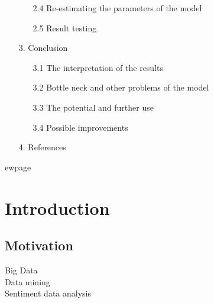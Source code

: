 \documentclass {article}
\begin{document}
\begin{enumerate}
\begin{enumerate}
			\item[2.4] Re-estimating the parameters of the model 
			\item[2.5] Result testing
		\end{enumerate}
	\item[3.] Conclusion
		\begin{enumerate}
			\item[3.1] The interpretation of the results
			\item[3.2] Bottle neck and other problems of the model
			\item[3.3] The potential and further use
			\item[3.4] Possible improvements
		\end{enumerate}
	\item[4.] References
\end{enumerate}

 ewpage
\section{Introduction}
\subsection{Motivation}
Big Data\\
Data mining\\
Sentiment data analysis
\end{document}
